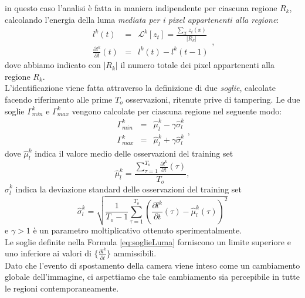 in questo caso l'analisi \`e fatta in maniera indipendente per ciascuna regione $R_k$, calcolando l'energia della luma \textit{mediata per i pixel appartenenti alla regione}:
\begin{equation}
	\label{eq:lumaRegions}
	\begin{array}{ccc}
	l^k(t)&  = & \mathcal{L}^k[z_t] = \frac{\sum_{\mathcal{X}} z_t(x) }{|{R_k}|}\\
	\frac{\partial l^k}{\partial t}(t) & =& l^k(t)-l^k(t-1) 
	\end{array},
\end{equation}
dove abbiamo indicato con $|{R_k}|$ il numero totale dei pixel appartenenti alla regione $R_k$.\\
L'identificazione viene fatta attraverso la definizione di due \textit{soglie}, calcolate facendo riferimento alle prime $T_{o}$ osservazioni, ritenute prive di tampering.
Le due soglie $\Gamma_{min}^k$ e $\Gamma_{max}^k$ vengono calcolate per ciascuna regione nel seguente modo:
\begin{equation}
\label{eq:soglieLuma}
\begin{array}{rcl}
\Gamma_{min}^k & = & \widehat{\mu}_l^k -\gamma \widehat{\sigma}_l^k\\
\Gamma_{max}^k & = & \widehat{\mu}_l^k + \gamma \widehat{\sigma}_l^k
\end{array},
\end{equation}
dove $\widehat{\mu}_l^k$ indica il valore medio delle osservazioni del training set
\begin{equation}
\widehat{\mu}_l^k = \frac{\sum_{\tau = 1}^{T_{o}} \frac{\partial l^k}{\partial t}(\tau)}{T_{o}}, \nonumber
\end{equation}
$\widehat{\sigma}_l^k$ indica la deviazione standard delle osservazioni del training set
\begin{equation}
\widehat{\sigma}_l^k  = \sqrt{\frac{1}{T_{o}-1}\sum_{\tau=1}^{T_{o}}\left(\frac{\partial l^k}{\partial t}(\tau) - \widehat{\mu}_l^k(\tau)\right)^2} \nonumber
\end{equation}
e $\gamma>1$ \`e un parametro moltiplicativo ottenuto sperimentalmente.\\
Le soglie definite nella Formula \eqref{eq:soglieLuma} forniscono un limite superiore e uno inferiore ai valori di $\{\frac{\partial l^k}{\partial t}\}$ ammissibili.\\
Dato che l'evento di spostamento della camera viene inteso come un cambiamento globale dell'immagine, ci aspettiamo che tale cambiamento sia percepibile in tutte le regioni contemporaneamente. 
